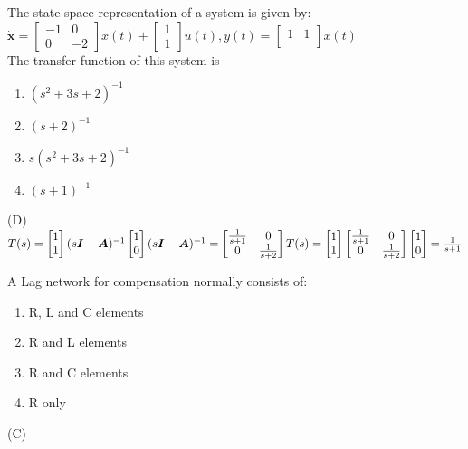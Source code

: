 \documentclass[a4paper]{exam}
\begin{document}
\begin{questions}
\question
The state-space representation of a system is given
by:\\
$
\boldsymbol{\dot{x}}=
\begin{bmatrix}
-1 & 0\\
0 & -2
\end{bmatrix} 
x(t)+
\begin{bmatrix}
1 \\
1 
\end{bmatrix}
u(t), y(t) = 
\begin{bmatrix}
1 & 1\\
\end{bmatrix} 
x(t)
\ \ \ 
$
\\The transfer function of this system is
\begin{enumerate}[label=(\Alph*)]
\item ${(s^2+3s+2)}^{-1}$
\item ${(s+2)}^{-1}$
\item $s{(s^2+3s+2)}^{-1}$
\item ${(s+1)}^{-1}$
\end{enumerate}
\begin{solution}
(D)
\\ $T(s)=
\begin{bmatrix}
1 \\
1 
\end{bmatrix}
{(s\boldsymbol{I}-\boldsymbol{A})^{-1}}
\begin{bmatrix}
1 \\
0 
\end{bmatrix}\\
(s\boldsymbol{I}-\boldsymbol{A})^{-1}=
\begin{bmatrix}
\frac{1}{s+1} & 0\\
0 & \frac{1}{s+2}
\end{bmatrix} 
\\T(s)=
\begin{bmatrix}
1 \\
1 
\end{bmatrix}
\begin{bmatrix}
\frac{1}{s+1} & 0\\
0 & \frac{1}{s+2}
\end{bmatrix}
\begin{bmatrix}
1 \\
0 
\end{bmatrix}
=\frac{1}{s+1}
$
\end{solution}


\question
A Lag network for compensation normally consists of:
\begin{enumerate}[label=(\Alph*)]
\item R, L and C elements
\item R and L elements
\item R and C elements
\item R only
\end{enumerate}
\begin{solution}
(C)
\end{solution}


\end{questions}
\end{document}

